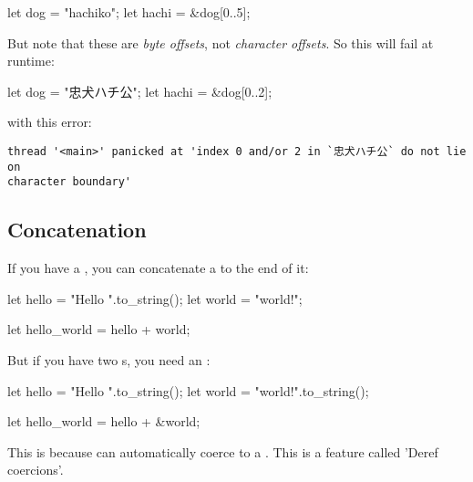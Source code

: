\begin{rustc}
let dog = "hachiko";
let hachi = &dog[0..5];
\end{rustc}

But note that these are \emph{byte offsets}, not \emph{character offsets}. So this will fail at runtime:

\begin{rustc}
let dog = "忠犬ハチ公";
let hachi = &dog[0..2];
\end{rustc}

with this error:

\begin{verbatim}
thread '<main>' panicked at 'index 0 and/or 2 in `忠犬ハチ公` do not lie on
character boundary'
\end{verbatim}

\subsection*{Concatenation}

If you have a \String, you can concatenate a  to the end of it:

\begin{rustc}
let hello = "Hello ".to_string();
let world = "world!";

let hello_world = hello + world;
\end{rustc}

But if you have two \String s, you need an \code{\&}:

\begin{rustc}
let hello = "Hello ".to_string();
let world = "world!".to_string();

let hello_world = hello + &world;
\end{rustc}

This is because  can automatically coerce to a . This is a feature called 'Deref coercions'.
